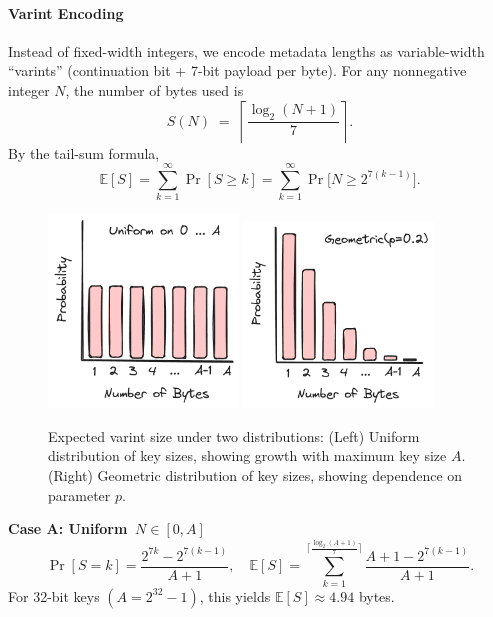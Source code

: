 \documentclass[10pt]{article}
\begin{document}
\paragraph{Varint Encoding}
Instead of fixed-width integers, we encode metadata lengths as variable-width “varints” (continuation bit + 7-bit payload per byte).  For any nonnegative integer \(N\), the number of bytes used is
\[
S(N) \;=\;\left\lceil \frac{\log_{2}(N+1)}{7} \right\rceil.
\]
By the tail-sum formula,
\[
\mathbb{E}[S] = \sum_{k=1}^{\infty} \Pr[S \ge k]
           = \sum_{k=1}^{\infty} \Pr\bigl[N \ge 2^{7(k-1)}\bigr].
\]

\begin{figure}[htbp]
    \centering
    \includegraphics[width=0.45\textwidth]{uniform.png}
    \includegraphics[width=0.45\textwidth]{geometric.png}
    \caption{Expected varint size under two distributions: (Left) Uniform distribution of key sizes, showing growth with maximum key size \(A\). (Right) Geometric distribution of key sizes, showing dependence on parameter \(p\).}
    \label{fig:varint_combined}
\end{figure}


\textbf{Case A: Uniform \(\,N\in[0,A]\)}
\[
\Pr[S = k]
= \frac{2^{7k} - 2^{7(k-1)}}{A+1},
\quad
\mathbb{E}[S]
= \sum_{k=1}^{\lceil\frac{\log_2(A+1)}{7}\rceil}
  \frac{A+1 - 2^{7(k-1)}}{A+1}.
\]
For 32-bit keys \((A=2^{32}-1)\), this yields \(\mathbb{E}[S]\approx4.94\) bytes.
\end{document}
